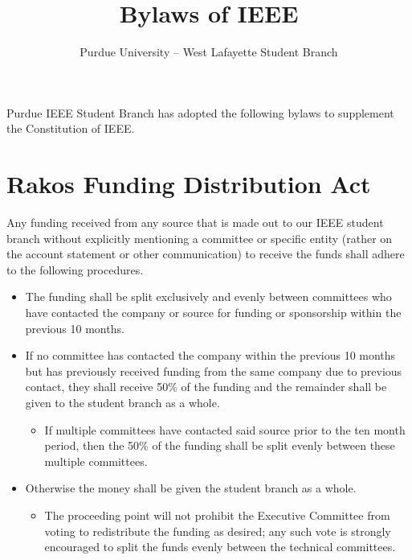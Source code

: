 \documentclass[12pt]{constitution}
\title{Bylaws of IEEE}
\author{Purdue University -- West Lafayette Student Branch}
\date{}
\begin{document}

\titlecontentspage
\newpage


\label{art:preamble}

Purdue IEEE Student Branch has adopted the following bylaws to supplement the Constitution of IEEE.

\label{art:excom}


\section{Rakos Funding Distribution Act}
\label{byl:Rakos}
Any funding received from any source that is made out to our IEEE student branch without explicitly mentioning a committee or specific entity (rather on the account statement or other communication) to receive the funds shall adhere to the following procedures.
\begin{itemize}
    \item The funding shall be split exclusively and evenly between committees who have contacted the company or source for funding or sponsorship within the previous 10 months.
    \item If no committee has contacted the company within the previous 10 months but has previously received funding from the same company due to previous contact, they shall receive 50\% of the funding and the remainder shall be given to the student branch as a whole.
    \begin{itemize}
        \item If multiple committees have contacted said source prior to the ten month period, then the 50\% of the funding shall be split evenly between these multiple committees.
    \end{itemize}
    \item Otherwise the money shall be given the student branch as a whole.
    \begin{itemize}
        \item The proceeding point will not prohibit the Executive Committee from voting to redistribute the funding as desired; any such vote is strongly encouraged to split the funds evenly between the technical committees. 
    \end{itemize}
\end{itemize}


\end{document}

